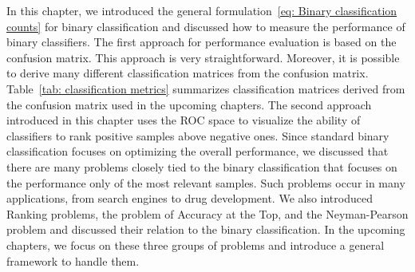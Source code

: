 In this chapter, we introduced the general formulation~\eqref{eq: Binary classification counts} for binary classification and discussed how to measure the performance of binary classifiers. The first approach for performance evaluation is based on the confusion matrix. This approach is very straightforward. Moreover, it is possible to derive many different classification matrices from the confusion matrix. Table~\ref{tab: classification metrics} summarizes classification matrices derived from the confusion matrix used in the upcoming chapters. The second approach introduced in this chapter uses the ROC space to visualize the ability of classifiers to rank positive samples above negative ones. Since standard binary classification focuses on optimizing the overall performance, we discussed that there are many problems closely tied to the binary classification that focuses on the performance only of the most relevant samples. Such problems occur in many applications, from search engines to drug development. We also introduced Ranking problems, the problem of Accuracy at the Top, and the Neyman-Pearson problem and discussed their relation to the binary classification. In the upcoming chapters, we focus on these three groups of problems and introduce a general framework to handle them.
